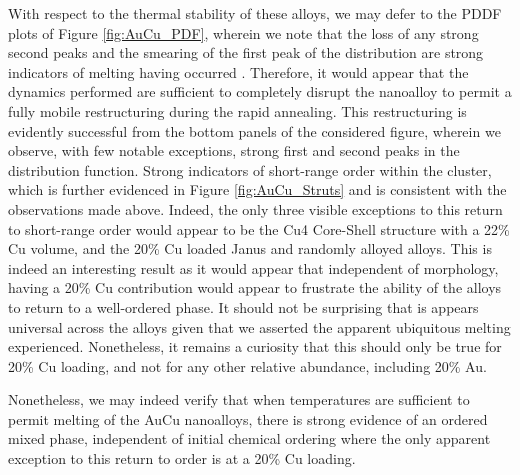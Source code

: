 With respect to the thermal stability of these alloys, we may defer to the PDDF plots of Figure \ref{fig:AuCu_PDF}, wherein we note that the loss of any strong second peaks and the smearing of the first peak of the distribution are strong indicators of melting having occurred \cite{LaiaMelt}. Therefore, it would appear that the dynamics performed are sufficient to completely disrupt the nanoalloy to permit a fully mobile restructuring during the rapid annealing. This restructuring is evidently successful from the bottom panels of the considered figure, wherein we observe, with few notable exceptions, strong first and second peaks in the distribution function. Strong indicators of short-range order within the cluster, which is further evidenced in Figure \ref{fig:AuCu_Struts} and is consistent with the observations made above. Indeed, the only three visible exceptions to this return to short-range order would appear to be the Cu4 Core-Shell structure with a 22\% Cu volume, and the 20\% Cu loaded Janus and randomly alloyed alloys. This is indeed an interesting result as it would appear that independent of morphology, having a 20\% Cu contribution would appear to frustrate the ability of the alloys to return to a well-ordered phase. It should not be surprising that is appears universal across the alloys given that we asserted the apparent ubiquitous melting experienced. Nonetheless, it remains a curiosity that this should only be true for 20\% Cu loading, and not for any other relative abundance, including 20\% Au.

Nonetheless, we may indeed verify that when temperatures are sufficient to permit melting of the AuCu nanoalloys, there is strong evidence of an ordered mixed phase, independent of initial chemical ordering where the only apparent exception to this return to order is at a 20\% Cu loading.


